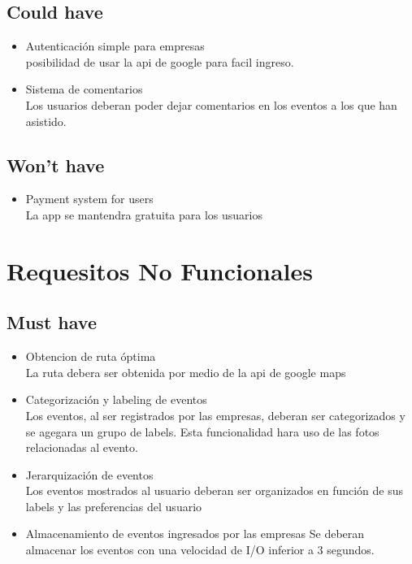 \documentclass[a4paper,12pt,oneside]{article}
\begin{document}
\subsection{Could have}
  \begin{itemize}
    \item Autenticación simple para empresas \\
      posibilidad de usar la api de google para facil ingreso.
    \item Sistema de comentarios \\
      Los usuarios deberan poder dejar comentarios en los eventos a los que han asistido.
  \end{itemize}

\subsection{Won't have}
  \begin{itemize}
    \item Payment system for users \\
      La app se mantendra gratuita para los usuarios
  \end{itemize}

\section{Requesitos No Funcionales}

\subsection{Must have}
  \begin{itemize}
    \item Obtencion de ruta óptima \\
      La ruta debera ser obtenida por medio de la api de google maps
    \item Categorización y labeling de eventos \\
      Los eventos, al ser registrados por las empresas, deberan ser categorizados y se agegara un grupo de labels. Esta funcionalidad hara uso de las fotos relacionadas al evento.
    \item Jerarquización de eventos \\
      Los eventos mostrados al usuario deberan ser organizados en función de sus labels y las preferencias del usuario
    \item Almacenamiento de eventos ingresados por las empresas
      Se deberan almacenar los eventos con una velocidad de I/O inferior a 3 segundos.
  \end{itemize}
\end{document}
